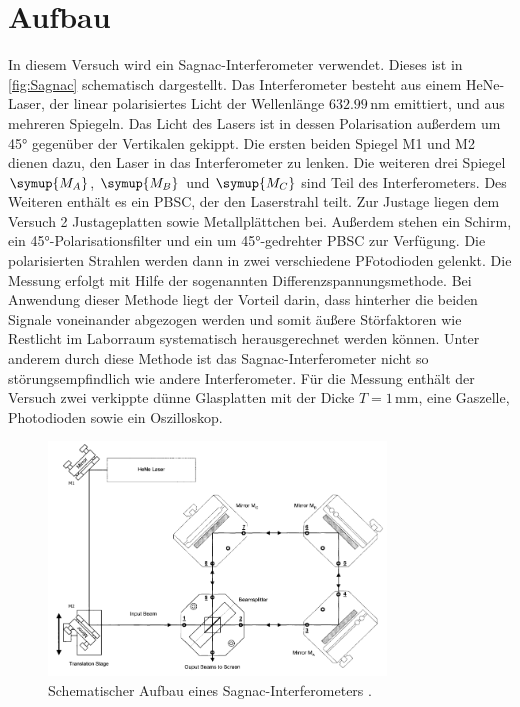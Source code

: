 \section{Aufbau}
\label{sec:Aufbau}
In diesem Versuch wird ein Sagnac-Interferometer verwendet. Dieses ist in \autoref{fig:Sagnac}
schematisch dargestellt. 
Das Interferometer besteht aus einem HeNe-Laser, der linear polarisiertes Licht der Wellenlänge $632.99\,\unit{\nano\meter}$
emittiert, und aus mehreren Spiegeln. Das Licht des Lasers ist in dessen Polarisation außerdem um 45° gegenüber der Vertikalen gekippt.
Die ersten beiden Spiegel M1 und M2 dienen dazu, den Laser in das Interferometer zu lenken. Die weiteren drei Spiegel $\symup{M_A}$, 
$\symup{M_B}$ und $\symup{M_C}$ sind Teil des Interferometers. Des Weiteren enthält es ein PBSC, der den Laserstrahl teilt.
Zur Justage liegen dem Versuch 2 Justageplatten sowie Metallplättchen bei. Außerdem stehen ein Schirm, ein 45°-Polarisationsfilter und ein um 45°-gedrehter
PBSC zur Verfügung. Die polarisierten Strahlen werden dann in zwei verschiedene PFotodioden gelenkt.
Die Messung erfolgt mit Hilfe der sogenannten Differenzspannungsmethode.
Bei Anwendung dieser Methode liegt der Vorteil darin, 
dass hinterher die beiden Signale voneinander abgezogen werden und somit äußere Störfaktoren wie Restlicht im Laborraum systematisch herausgerechnet werden können.
Unter anderem durch diese Methode ist das Sagnac-Interferometer nicht so störungsempfindlich wie andere Interferometer.
Für die Messung enthält der Versuch zwei verkippte dünne Glasplatten mit der Dicke $T=1\,\mathrm{mm}$, eine Gaszelle, Photodioden sowie
ein Oszilloskop.
\begin{figure}
    \centering
    \includegraphics[width=0.8\textwidth]{Sagnac.png}
    \caption{Schematischer Aufbau eines Sagnac-Interferometers \cite{ap64}.}
    \label{fig:Sagnac}
\end{figure}